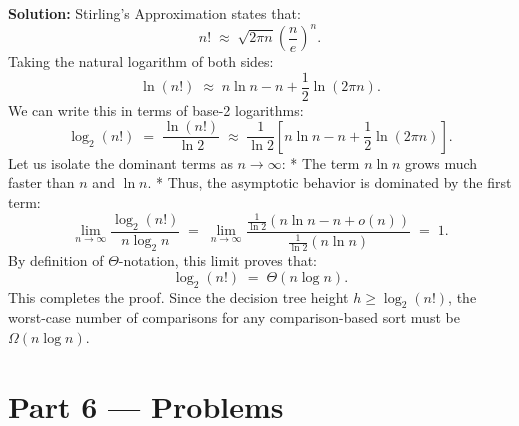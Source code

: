 \documentclass[12pt, a4paper]{book}
\begin{document}
\begin{problembox}
\begin{enumerate}[label=\textbf{E\arabic*.}]
        \textbf{Solution:}
        Stirling's Approximation states that:
        \[
          n! \;\approx\; \sqrt{2 \pi n} \left( \frac{n}{e} \right)^n.
        \]
        Taking the natural logarithm of both sides:
        \[
          \ln(n!) \;\approx\; n \ln n - n + \frac{1}{2} \ln(2 \pi n).
        \]
        We can write this in terms of base-2 logarithms:
        \[
          \log_2(n!) \;=\; \frac{\ln(n!)}{\ln 2} \;\approx\; \frac{1}{\ln 2} \left[ n \ln n - n + \frac{1}{2} \ln(2\pi n) \right].
        \]
        Let us isolate the dominant terms as $n \to \infty$:
        * The term $n \ln n$ grows much faster than $n$ and $\ln n$.
        * Thus, the asymptotic behavior is dominated by the first term:
          \[
            \lim_{n \to \infty} \frac{\log_2(n!)}{n \log_2 n} \;=\; \lim_{n \to \infty} \frac{\frac{1}{\ln 2} (n \ln n - n + o(n))}{\frac{1}{\ln 2} (n \ln n)} \;=\; 1.
          \]
        By definition of $\Theta$-notation, this limit proves that:
        \[
          \log_2(n!) \;=\; \Theta(n \log n).
        \]
        This completes the proof. Since the decision tree height $h \ge \log_2(n!)$, the worst-case number of comparisons for any comparison-based sort must be $\Omega(n \log n)$.
\end{enumerate}
\end{problembox}

\newpage

\section{Part 6 --- Problems}
\end{document}
